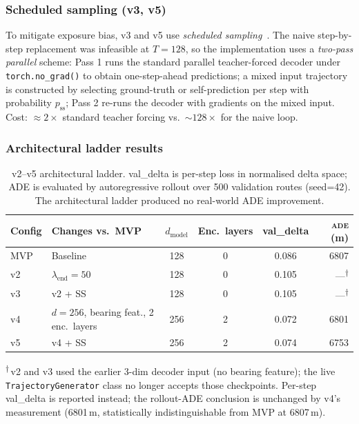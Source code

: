 \documentclass[11pt,a4paper]{article}
\newcommand{\ade}{\textsc{ade}}
\begin{document}
\subsubsection{Scheduled sampling (v3, v5)}

To mitigate exposure bias, v3 and v5 use \emph{scheduled sampling}~\cite{bengio2015scheduled}.
The naive step-by-step replacement was infeasible at $T=128$, so the
implementation uses a \emph{two-pass parallel} scheme:
Pass 1 runs the standard parallel teacher-forced decoder under
\texttt{torch.no\_grad()} to obtain one-step-ahead predictions;
a mixed input trajectory is constructed by selecting ground-truth or self-prediction
per step with probability $p_\text{ss}$;
Pass 2 re-runs the decoder with gradients on the mixed input.
Cost: $\approx 2\times$ standard teacher forcing vs.\ $\sim128\times$ for the naive loop.

\subsubsection{Architectural ladder results}

\begin{table}[ht]
\centering
\caption{v2--v5 architectural ladder.
         val\_delta is per-step loss in normalised delta space; ADE is evaluated by
         autoregressive rollout over 500 validation routes (seed=42).
         The architectural ladder produced no real-world ADE improvement.}
\label{tab:v2v5}
\begin{tabular}{llcccr}
\toprule
Config & Changes vs.\ MVP & $d_\text{model}$ & Enc.\ layers & val\_delta & \ade{} (m) \\
\midrule
MVP    & Baseline          & 128 & 0 & 0.086 & 6807 \\
v2     & $\lambda_\text{end}=50$   & 128 & 0 & 0.105 & ---\textsuperscript{$\dagger$} \\
v3     & v2 + SS           & 128 & 0 & 0.105 & ---\textsuperscript{$\dagger$} \\
v4     & $d\!=\!256$, bearing feat., 2 enc.\ layers & 256 & 2 & 0.072 & 6801 \\
v5     & v4 + SS           & 256 & 2 & 0.074 & 6753 \\
\bottomrule
\end{tabular}
\vspace{0.3em}
\small\textsuperscript{$\dagger$}\,v2 and v3 used the earlier 3-dim decoder
input (no bearing feature); the live \texttt{TrajectoryGenerator} class no
longer accepts those checkpoints.  Per-step val\_delta is reported instead;
the rollout-ADE conclusion is unchanged by v4's measurement (6801\,m,
statistically indistinguishable from MVP at 6807\,m).
\end{table}
\end{document}
